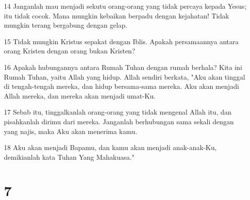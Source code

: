 \par 14 Janganlah mau menjadi sekutu orang-orang yang tidak percaya kepada Yesus; itu tidak cocok. Mana mungkin kebaikan berpadu dengan kejahatan! Tidak mungkin terang bergabung dengan gelap.
\par 15 Tidak mungkin Kristus sepakat dengan Iblis. Apakah persamaannya antara orang Kristen dengan orang bukan Kristen?
\par 16 Apakah hubungannya antara Rumah Tuhan dengan rumah berhala? Kita ini Rumah Tuhan, yaitu Allah yang hidup. Allah sendiri berkata, "Aku akan tinggal di tengah-tengah mereka, dan hidup bersama-sama mereka. Aku akan menjadi Allah mereka, dan mereka akan menjadi umat-Ku.
\par 17 Sebab itu, tinggalkanlah orang-orang yang tidak mengenal Allah itu, dan pisahkanlah dirimu dari mereka. Janganlah berhubungan sama sekali dengan yang najis, maka Aku akan menerima kamu.
\par 18 Aku akan menjadi Bapamu, dan kamu akan menjadi anak-anak-Ku, demikianlah kata Tuhan Yang Mahakuasa."

\chapter{7}

